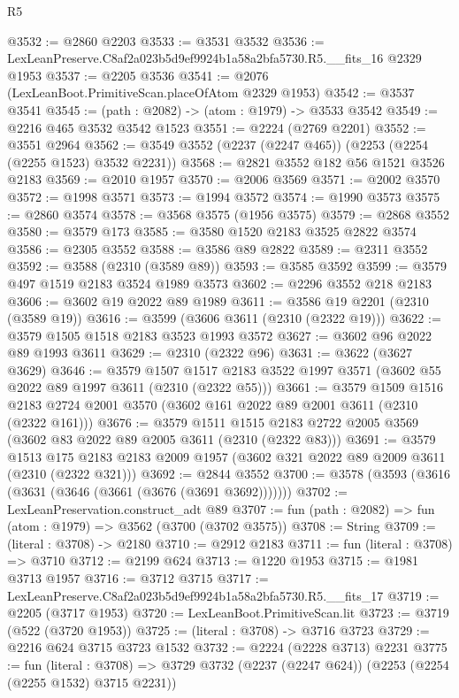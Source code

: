 \begin{lexlean}{R5}
\begin{coremodule}
@3532 := @2860 @2203
@3533 := @3531 @3532
@3536 := LexLeanPreserve.C8af2a023b5d9ef9924b1a58a2bfa5730.R5.__fits_16 @2329 @1953
@3537 := @2205 @3536
@3541 := @2076 (LexLeanBoot.PrimitiveScan.placeOfAtom @2329 @1953)
@3542 := @3537 @3541
@3545 := (path : @2082) -> (atom : @1979) -> @3533 @3542
@3549 := @2216 @465 @3532 @3542 @1523
@3551 := @2224 (@2769 @2201)
@3552 := @3551 @2964
@3562 := @3549 @3552 (@2237 (@2247 @465)) (@2253 (@2254 (@2255 @1523) @3532 @2231))
@3568 := @2821 @3552 @182 @56 @1521 @3526 @2183
@3569 := @2010 @1957
@3570 := @2006 @3569
@3571 := @2002 @3570
@3572 := @1998 @3571
@3573 := @1994 @3572
@3574 := @1990 @3573
@3575 := @2860 @3574
@3578 := @3568 @3575 (@1956 @3575)
@3579 := @2868 @3552
@3580 := @3579 @173
@3585 := @3580 @1520 @2183 @3525 @2822 @3574
@3586 := @2305 @3552
@3588 := @3586 @89 @2822
@3589 := @2311 @3552
@3592 := @3588 (@2310 (@3589 @89))
@3593 := @3585 @3592
@3599 := @3579 @497 @1519 @2183 @3524 @1989 @3573
@3602 := @2296 @3552 @218 @2183
@3606 := @3602 @19 @2022 @89 @1989
@3611 := @3586 @19 @2201 (@2310 (@3589 @19))
@3616 := @3599 (@3606 @3611 (@2310 (@2322 @19)))
@3622 := @3579 @1505 @1518 @2183 @3523 @1993 @3572
@3627 := @3602 @96 @2022 @89 @1993 @3611
@3629 := @2310 (@2322 @96)
@3631 := @3622 (@3627 @3629)
@3646 := @3579
    @1507
    @1517
    @2183
    @3522
    @1997
    @3571
    (@3602 @55 @2022 @89 @1997 @3611 (@2310 (@2322 @55)))
@3661 := @3579
    @1509
    @1516
    @2183
    @2724
    @2001
    @3570
    (@3602 @161 @2022 @89 @2001 @3611 (@2310 (@2322 @161)))
@3676 := @3579
    @1511
    @1515
    @2183
    @2722
    @2005
    @3569
    (@3602 @83 @2022 @89 @2005 @3611 (@2310 (@2322 @83)))
@3691 := @3579
    @1513
    @175
    @2183
    @2183
    @2009
    @1957
    (@3602 @321 @2022 @89 @2009 @3611 (@2310 (@2322 @321)))
@3692 := @2844 @3552
@3700 := @3578 (@3593 (@3616 (@3631 (@3646 (@3661 (@3676 (@3691 @3692)))))))
@3702 := LexLeanPreservation.construct_adt @89
@3707 := fun (path : @2082) => fun (atom : @1979) => @3562 (@3700 (@3702 @3575))
@3708 := String
@3709 := (literal : @3708) -> @2180
@3710 := @2912 @2183
@3711 := fun (literal : @3708) => @3710
@3712 := @2199 @624
@3713 := @1220 @1953
@3715 := @1981 @3713 @1957
@3716 := @3712 @3715
@3717 := LexLeanPreserve.C8af2a023b5d9ef9924b1a58a2bfa5730.R5.__fits_17
@3719 := @2205 (@3717 @1953)
@3720 := LexLeanBoot.PrimitiveScan.lit
@3723 := @3719 (@522 (@3720 @1953))
@3725 := (literal : @3708) -> @3716 @3723
@3729 := @2216 @624 @3715 @3723 @1532
@3732 := @2224 (@2228 @3713) @2231
@3775 := fun (literal : @3708) =>
  @3729
    @3732
    (@2237 (@2247 @624))
    (@2253 (@2254 (@2255 @1532) @3715 @2231))

\end{coremodule}
\end{lexlean}
